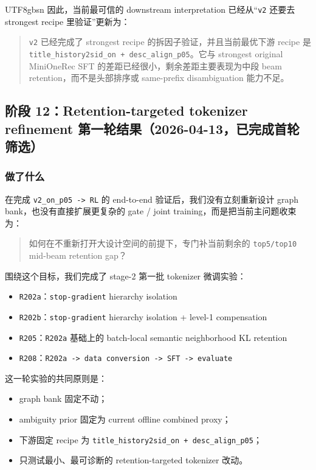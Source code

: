 \documentclass[11pt]{article}
\begin{document}
\begin{CJK*}{UTF8}{gbsn}
因此，当前最可信的 downstream interpretation 已经从“\texttt{v2} 还要去 strongest recipe 里验证”更新为：

\begin{quote}
\texttt{v2} 已经完成了 strongest recipe 的拆因子验证，并且当前最优下游 recipe 是 \texttt{title\_history2sid\_on + desc\_align\_p05}。它与 strongest original MiniOneRec SFT 的差距已经很小，剩余差距主要表现为中段 beam retention，而不是头部排序或 same-prefix disambiguation 能力不足。
\end{quote}

\subsection{阶段 12：Retention-targeted tokenizer refinement 第一轮结果（2026-04-13，已完成首轮筛选）}

\subsubsection*{做了什么}

在完成 \texttt{v2\_on\_p05 -> RL} 的 end-to-end 验证后，我们没有立刻重新设计 graph bank，也没有直接扩展更复杂的 gate / joint training，而是把当前主问题收束为：

\begin{quote}
如何在不重新打开大设计空间的前提下，专门补当前剩余的 \texttt{top5/top10} mid-beam retention gap？
\end{quote}

围绕这个目标，我们完成了 stage-2 第一批 tokenizer 微调实验：

\begin{itemize}
  \item \texttt{R202a}：\texttt{stop-gradient} hierarchy isolation
  \item \texttt{R202b}：\texttt{stop-gradient} hierarchy isolation + level-1 compensation
  \item \texttt{R205}：\texttt{R202a} 基础上的 batch-local semantic neighborhood KL retention
  \item \texttt{R208}：\texttt{R202a -> data conversion -> SFT -> evaluate}
\end{itemize}

这一轮实验的共同原则是：

\begin{itemize}
  \item graph bank 固定不动；
  \item ambiguity prior 固定为 current offline combined proxy；
  \item 下游固定 recipe 为 \texttt{title\_history2sid\_on + desc\_align\_p05}；
  \item 只测试最小、最可诊断的 retention-targeted tokenizer 改动。
\end{itemize}


\end{CJK*}
\end{document}
